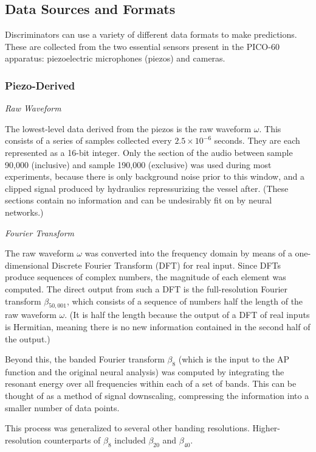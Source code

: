 \documentclass[10pt]{article}
\begin{document}
\subsection{Data Sources and Formats} \label{data_formats}

Discriminators can use a variety of different data formats to make predictions. These are collected from the two essential sensors present in the PICO-60 apparatus: piezoelectric microphones (piezos) and cameras.

\subsubsection{Piezo-Derived}

\textit{Raw Waveform}

The lowest-level data derived from the piezos is the raw waveform $\omega$. This consists of a series of samples collected every $2.5 \times 10^{-6}$ seconds. They are each represented as a 16-bit integer. Only the section of the audio between sample 90,000 (inclusive) and sample 190,000 (exclusive) was used during most experiments, because there is only background noise prior to this window, and a clipped signal produced by hydraulics repressurizing the vessel after. (These sections contain no information and can be undesirably fit on by neural networks.)

\textit{Fourier Transform}

The raw waveform $\omega$ was converted into the frequency domain by means of a one-dimensional Discrete Fourier Transform (DFT) for real input. Since DFTs produce sequences of complex numbers, the magnitude of each element was computed. The direct output from such a DFT is the full-resolution Fourier transform $\beta _{50,001}$, which consists of a sequence of numbers half the length of the raw waveform $\omega$. (It is half the length because the output of a DFT of real inputs is Hermitian, meaning there is no new information contained in the second half of the output.)

Beyond this, the banded Fourier transform $\beta_{8}$ (which is the input to the AP function and the original neural analysis) was computed by integrating the resonant energy over all frequencies within each of a set of bands. This can be thought of as a method of signal downscaling, compressing the information into a smaller number of data points.

This process was generalized to several other banding resolutions. Higher-resolution counterparts of $\beta_{8}$ included $\beta_{20}$ and $\beta_{40}$.
\end{document}
